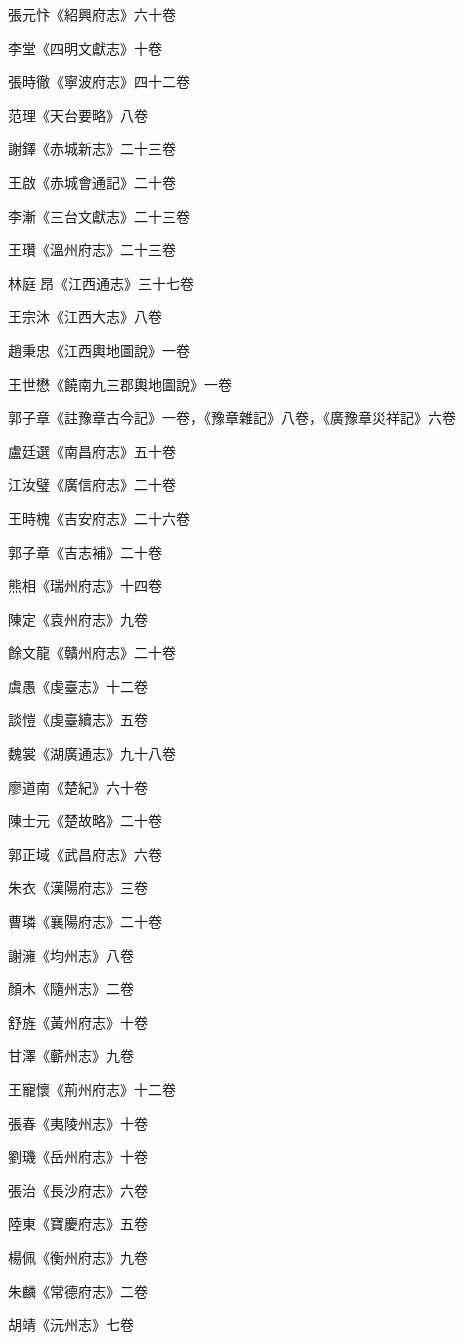 張元忭《紹興府志》六十卷

李堂《四明文獻志》十卷

張時徹《寧波府志》四十二卷

范理《天台要略》八卷

謝鐸《赤城新志》二十三卷

王啟《赤城會通記》二十卷

李漸《三台文獻志》二十三卷

王瓚《溫州府志》二十三卷

林庭昂《江西通志》三十七卷

王宗沐《江西大志》八卷

趙秉忠《江西輿地圖說》一卷

王世懋《饒南九三郡輿地圖說》一卷

郭子章《註豫章古今記》一卷，《豫章雜記》八卷，《廣豫章災祥記》六卷

盧廷選《南昌府志》五十卷

江汝璧《廣信府志》二十卷

王時槐《吉安府志》二十六卷

郭子章《吉志補》二十卷

熊相《瑞州府志》十四卷

陳定《袁州府志》九卷

餘文龍《贛州府志》二十卷

虞愚《虔臺志》十二卷

談愷《虔臺續志》五卷

魏裳《湖廣通志》九十八卷

廖道南《楚紀》六十卷

陳士元《楚故略》二十卷

郭正域《武昌府志》六卷

朱衣《漢陽府志》三卷

曹璘《襄陽府志》二十卷

謝澭《均州志》八卷

顏木《隨州志》二卷

舒旌《黃州府志》十卷

甘澤《蘄州志》九卷

王寵懷《荊州府志》十二卷

張春《夷陵州志》十卷

劉璣《岳州府志》十卷

張治《長沙府志》六卷

陸東《寶慶府志》五卷

楊佩《衡州府志》九卷

朱麟《常德府志》二卷

胡靖《沅州志》七卷

